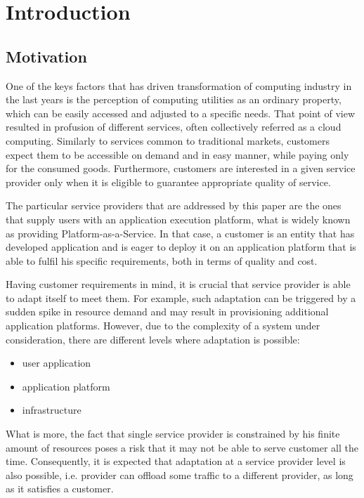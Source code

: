 \chapter{Introduction}

\section{Motivation}
One of the keys factors that has driven transformation of computing industry in the last years is the perception of computing utilities as an ordinary property, which can be easily accessed and adjusted to a specific needs. That point of view resulted in profusion of different services, often collectively referred as a cloud computing. Similarly to services common to traditional markets, customers expect them to be accessible on demand and in easy manner, while paying only for the consumed goods. Furthermore, customers are interested in a given service provider only when it is eligible to guarantee appropriate quality of service.

The particular service providers that are addressed by this paper are the ones that supply users with an application execution platform, what is widely known as providing Platform-as-a-Service. In that case, a customer is an entity that has developed application and is eager to deploy it on an application platform that is able to fulfil his specific requirements, both in terms of quality and cost.

Having customer requirements in mind, it is crucial that service provider is able to adapt itself to meet them. For example, such adaptation can be triggered by a sudden spike in resource demand and may result in provisioning additional application platforms. However, due to the complexity of a system under consideration, there are different levels where adaptation is possible:
\begin{itemize}
	\item user application
	\item application platform
	\item infrastructure
\end{itemize} 
What is more, the fact that single service provider is constrained by his finite amount of resources poses a risk that it may not be able to serve customer all the time. Consequently, it is expected that adaptation at a service provider level is also possible, i.e. provider can offload some traffic to a different provider, as long as it satisfies a customer.

